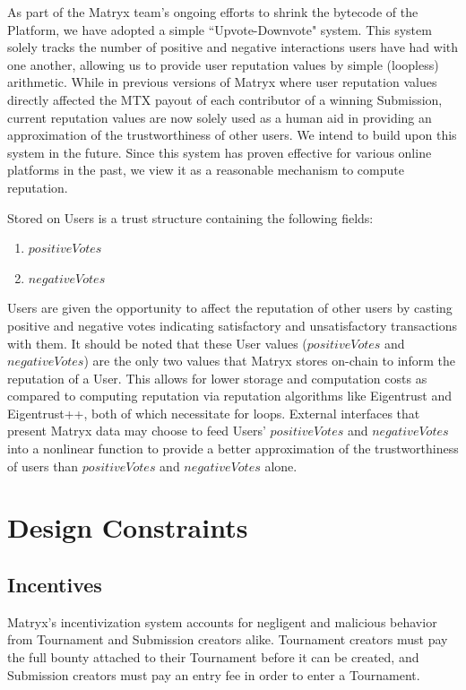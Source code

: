 \documentclass[a4paper, 10pt, conference]{ieeeconf}      %
\begin{document}
As part of the Matryx team's ongoing efforts to shrink the bytecode of the Platform, we have adopted a simple ``Upvote-Downvote" system. 
This system solely tracks the number of positive and negative interactions users have had with one another, allowing us to provide user reputation values by simple (loopless) arithmetic. 
While in previous versions of Matryx where user reputation values directly affected the MTX payout of each contributor of a winning Submission, current reputation values are now solely used as a human aid in providing an approximation of the trustworthiness of other users. 
We intend to build upon this system in the future. 
Since this system has proven effective for various online platforms in the past, we view it as a reasonable mechanism to compute reputation.

Stored on Users is a trust structure containing the following fields:
\begin{enumerate}
\item $positiveVotes$
\item $negativeVotes$
\end{enumerate}

Users are given the opportunity to affect the reputation of other users by casting positive and negative votes indicating  satisfactory and unsatisfactory transactions with them.
It should be noted that these User values ($positiveVotes$ and $negativeVotes$) are the only two values that Matryx stores on-chain to inform the reputation of a User. This allows for lower storage and computation costs as compared to computing reputation via reputation algorithms like Eigentrust and Eigentrust++, both of which necessitate for loops. External interfaces that present Matryx data may choose to feed Users' $positiveVotes$ and $negativeVotes$ into a nonlinear function to provide a better approximation of the trustworthiness of users than $positiveVotes$ and $negativeVotes$ alone.

\section{Design Constraints}\label{designconstraints}
\subsection{Incentives}\label{incentives}
Matryx's incentivization system accounts for negligent and malicious behavior from Tournament and Submission creators alike. Tournament creators must pay the full bounty attached to their Tournament before it can be created, and Submission creators must pay an entry fee in order to enter a Tournament. 
\end{document}
